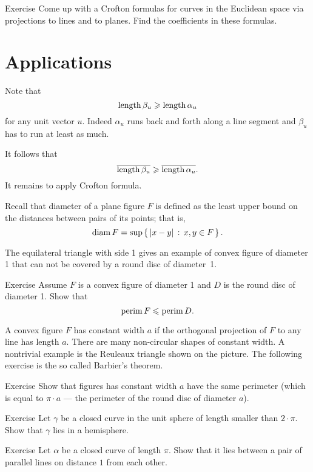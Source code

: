 \begin{thm}{Exercise}
Come up with a Crofton formulas for curves in the Euclidean space via projections to lines and to planes.
Find the coefficients in these formulas.
\end{thm}

\section{Applications}

Note that 
\[\mathop{\rm length}\nolimits \beta_u\geqslant \mathop{\rm length}\nolimits \alpha_u\]
for any unit vector $u$.
Indeed $\alpha_u$ runs back and forth along a line segment and $\beta_u$ has to run at least as much.

It follows that 
\[\overline{\mathop{\rm length}\nolimits \beta_u}\geqslant \overline{\mathop{\rm length}\nolimits \alpha_u}.\]
It remains to apply Crofton formula.
\qeds


Recall that diameter of a plane figure $F$ is defined as the least upper bound on the distances between pairs of its points;
that is,
\[\mathop{\rm diam}\nolimits F=\sup\left\{\,{|x-y|}\,:\,{x,y\in F}\,\right\}.\]

The equilateral triangle with side 1 gives an example of convex figure of diameter 1 that can not be covered by a round disc of diameter~1.

\begin{thm}{Exercise} 
Assume $F$ is a convex figure of diameter 1 and $D$ is the round disc of diameter 1.
Show that
\[\mathop{\rm perim}\nolimits F\leqslant \mathop{\rm perim}\nolimits D.\]
\end{thm}

A convex figure $F$ has constant width $a$ if the orthogonal projection of $F$ to any line has length $a$.
There are many non-circular shapes of constant width. 
A nontrivial example is the Reuleaux triangle shown on the picture.
The following exercise is the so called Barbier's theorem.

\begin{thm}{Exercise} 
Show that figures has constant width $a$ have the same perimeter (which is equal to $\pi\cdot a$ --- the perimeter of the round disc of diameter $a$).
\end{thm}

\begin{thm}{Exercise} 
Let $\gamma$ be a closed curve in the unit sphere of length smaller than $2\cdot\pi$.
Show that $\gamma$ lies in a hemisphere.
\end{thm}

\begin{thm}{Exercise} 
Let $\alpha$ be a closed curve of length $\pi$.
Show that it lies between a pair of parallel lines on distance $1$ from each other.
\end{thm}


